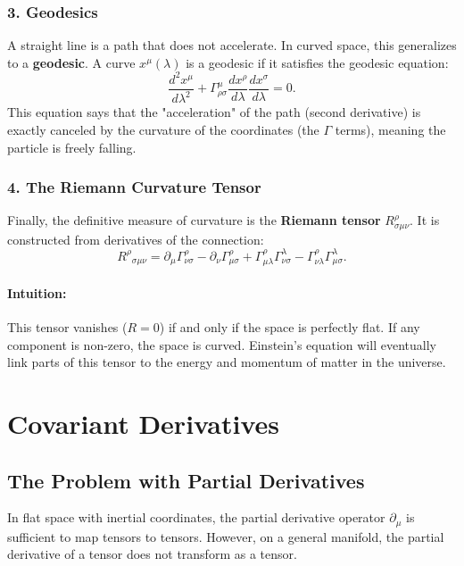 \documentclass[11pt, a4paper]{report}
\begin{document}
\subsubsection*{3. Geodesics}
A straight line is a path that does not accelerate. In curved space, this generalizes to a \textbf{geodesic}. A curve \(x^\mu(\lambda)\) is a geodesic if it satisfies the geodesic equation:
\begin{equation}
\label{eq:geodesic_preview}
\frac{d^{2}x^{\mu}}{d\lambda^{2}} + \Gamma_{\rho\sigma}^{\mu} \frac{dx^{\rho}}{d\lambda} \frac{dx^{\sigma}}{d\lambda} = 0.
\end{equation}
This equation says that the "acceleration" of the path (second derivative) is exactly canceled by the curvature of the coordinates (the \(\Gamma\) terms), meaning the particle is freely falling.

\subsubsection*{4. The Riemann Curvature Tensor}
Finally, the definitive measure of curvature is the \textbf{Riemann tensor} \(R^\rho_{\sigma\mu\nu}\). It is constructed from derivatives of the connection:
\begin{equation}
\label{eq:riemann_preview}
{R^{\rho}}_{\sigma\mu\nu} = \partial_{\mu}\Gamma_{\nu\sigma}^{\rho} - \partial_{\nu}\Gamma_{\mu\sigma}^{\rho} + \Gamma_{\mu\lambda}^{\rho}\Gamma_{\nu\sigma}^{\lambda} - \Gamma_{\nu\lambda}^{\rho}\Gamma_{\mu\sigma}^{\lambda}.
\end{equation}

\paragraph{Intuition:} This tensor vanishes (\(R=0\)) if and only if the space is perfectly flat. If any component is non-zero, the space is curved. Einstein's equation will eventually link parts of this tensor to the energy and momentum of matter in the universe.
\section{Covariant Derivatives}

\subsection*{The Problem with Partial Derivatives}
In flat space with inertial coordinates, the partial derivative operator \(\partial_\mu\) is sufficient to map tensors to tensors. However, on a general manifold, the partial derivative of a tensor does not transform as a tensor.
\end{document}
